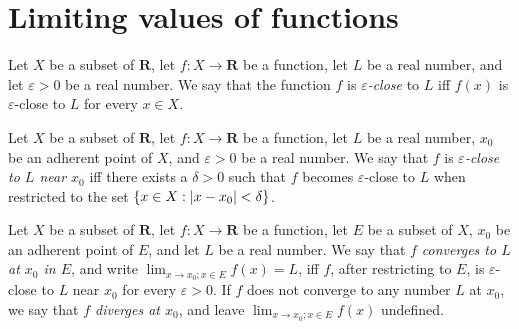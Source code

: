 \section{Limiting values of functions}\label{sec 9.3}

\begin{definition}\label{9.3.1}
    Let \(X\) be a subset of \(\mathbf{R}\), let \(f : X \to \mathbf{R}\) be a function, let \(L\) be a real number, and let \(\varepsilon > 0\) be a real number.
    We say that the function \(f\) is \emph{\(\varepsilon\)-close} to \(L\) iff \(f(x)\) is \(\varepsilon\)-close to \(L\) for every \(x \in X\).
\end{definition}

\setcounter{theorem}{2}
\begin{definition}\label{9.3.3}
    Let \(X\) be a subset of \(\mathbf{R}\), let \(f : X \to \mathbf{R}\) be a function, let \(L\) be a real number, \(x_0\) be an adherent point of \(X\), and \(\varepsilon > 0\) be a real number.
    We say that \(f\) is \emph{\(\varepsilon\)-close to \(L\) near \(x_0\)} iff there exists a \(\delta > 0\) such that \(f\) becomes \(\varepsilon\)-close to \(L\) when restricted to the set \(\{x \in X : \abs*{x - x_0} < \delta\}\).
\end{definition}

\setcounter{theorem}{5}
\begin{definition}\label{9.3.6}
    Let \(X\) be a subset of \(\mathbf{R}\), let \(f : X \to \mathbf{R}\) be a function, let \(E\) be a subset of \(X\), \(x_0\) be an adherent point of \(E\), and let \(L\) be a real number.
    We say that \emph{\(f\) converges to \(L\) at \(x_0\) in \(E\)}, and write \(\lim_{x \to x_0 ; x \in E} f(x) = L\), iff \(f\), after restricting to \(E\), is \(\varepsilon\)-close to \(L\) near \(x_0\) for every \(\varepsilon > 0\).
    If \(f\) does not converge to any number \(L\) at \(x_0\), we say that \emph{\(f\) diverges at \(x_0\)}, and leave \(\lim_{x \to x_0 ; x \in E} f(x)\) undefined.
\end{definition}
